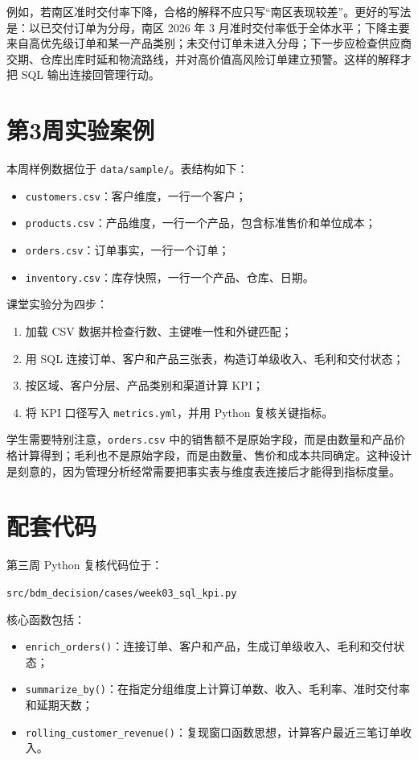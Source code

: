 \documentclass[UTF8,fontset=fandol,openany,zihao=-4]{ctexbook}
\begin{document}
例如，若南区准时交付率下降，合格的解释不应只写“南区表现较差”。更好的写法是：以已交付订单为分母，南区 2026 年 3 月准时交付率低于全体水平；下降主要来自高优先级订单和某一产品类别；未交付订单未进入分母；下一步应检查供应商交期、仓库出库时延和物流路线，并对高价值高风险订单建立预警。这样的解释才把 SQL 输出连接回管理行动。

\section{第3周实验案例}

本周样例数据位于 \texttt{data/sample/}。表结构如下：
\begin{itemize}
  \item \texttt{customers.csv}：客户维度，一行一个客户；
  \item \texttt{products.csv}：产品维度，一行一个产品，包含标准售价和单位成本；
  \item \texttt{orders.csv}：订单事实，一行一个订单；
  \item \texttt{inventory.csv}：库存快照，一行一个产品、仓库、日期。
\end{itemize}

课堂实验分为四步：
\begin{enumerate}
  \item 加载 CSV 数据并检查行数、主键唯一性和外键匹配；
  \item 用 SQL 连接订单、客户和产品三张表，构造订单级收入、毛利和交付状态；
  \item 按区域、客户分层、产品类别和渠道计算 KPI；
  \item 将 KPI 口径写入 \texttt{metrics.yml}，并用 Python 复核关键指标。
\end{enumerate}

学生需要特别注意，\texttt{orders.csv} 中的销售额不是原始字段，而是由数量和产品价格计算得到；毛利也不是原始字段，而是由数量、售价和成本共同确定。这种设计是刻意的，因为管理分析经常需要把事实表与维度表连接后才能得到指标度量。

\section{配套代码}

第三周 Python 复核代码位于：
\begin{center}
\texttt{src/bdm\_decision/cases/week03\_sql\_kpi.py}
\end{center}

核心函数包括：
\begin{itemize}
  \item \texttt{enrich\_orders()}：连接订单、客户和产品，生成订单级收入、毛利和交付状态；
  \item \texttt{summarize\_by()}：在指定分组维度上计算订单数、收入、毛利率、准时交付率和延期天数；
  \item \texttt{rolling\_customer\_revenue()}：复现窗口函数思想，计算客户最近三笔订单收入。
\end{itemize}
\end{document}
